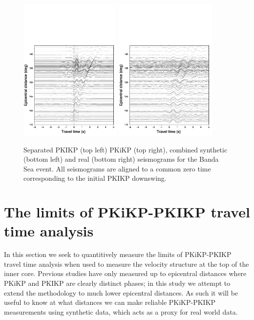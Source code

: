 \documentclass[11pt,a4paper]{article}
\begin{document}
\begin{figure}
	\includegraphics[width=0.45\textwidth]{figures/bandasea/bandasea_both_aligned}
	\includegraphics[width=0.45\textwidth]{figures/bandasea/bandasea_real_aligned}
	\caption{Separated PKIKP (top left) PKiKP (top right), combined synthetic (bottom left) and real (bottom right) seismograms for the Banda Sea event. All seismograms are aligned to a common zero time corresponding to the initial PKIKP downswing.}
	\label{fig:Synth aligned}
\end{figure}

\section{The limits of PKiKP-PKIKP travel time analysis}
\label{sec:Limits}

In this section we seek to quantitively measure the limits of PKiKP-PKIKP travel time analysis when used to measure the velocity structure at the top of the inner core. Previous studies have only measured up to epicentral distances where PKiKP and PKIKP are clearly distinct phases; in this study we attempt to extend the methodology to much lower epicentral distances. As such it will be useful to know at what distances we can make reliable PKiKP-PKIKP measurements using synthetic data, which acts as a proxy for real world data.
\end{document}
